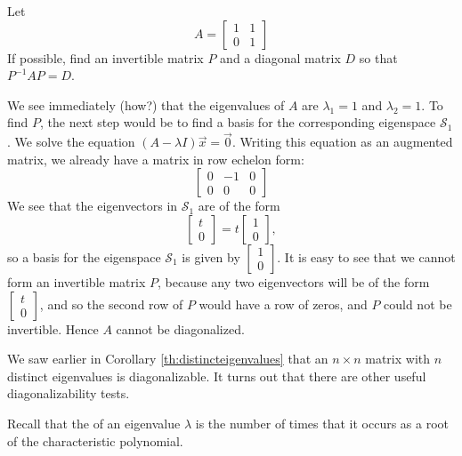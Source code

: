\documentclass{ximera}
\begin{document}
\begin{example}\label{ex:impossiblediagonalize}
Let
\begin{equation*}
A =
\begin{bmatrix}
1 & 1 \\
0 & 1
\end{bmatrix}
\end{equation*}
If possible, find an invertible matrix $P$ and a diagonal matrix $D$ so that $P^{-1}AP=D$.


\begin{explanation}
We see immediately (how?) that the eigenvalues of $A$ are $\lambda_1 =1$ and  $\lambda_2=1$.
To find $P$, the next step would be to find a basis for the corresponding eigenspace $\mathcal{S}_1$.  We solve the equation $\left( A - \lambda I \right) \vec{x} = \vec{0}$.
Writing this equation as an augmented matrix, we already have a matrix in row echelon form:
\begin{equation*}
\left[\begin{array}{cc|c}  
0 & -1 & 0 \\
0 & 0 & 0
 \end{array}\right]
\end{equation*}
We see that the eigenvectors in $\mathcal{S}_1$ are of the form
$$
\begin{bmatrix}
t \\
0
\end{bmatrix}
=t\begin{bmatrix}
1 \\
0
\end{bmatrix},
$$
so a basis for the eigenspace $\mathcal{S}_1$ is given by 
$\begin{bmatrix}
1 \\
0
\end{bmatrix}$.
It is easy to see that we cannot form an invertible matrix $P$, because any two eigenvectors will be of the form 
$\begin{bmatrix}
t \\
0
\end{bmatrix}$,
and so the second row of $P$ would have a row of zeros, and $P$ could not be invertible.  Hence $A$ cannot be diagonalized.
\end{explanation}
\end{example}
We saw earlier in Corollary \ref{th:distincteigenvalues} that an $n \times n$ matrix with $n$ distinct eigenvalues is diagonalizable.  It turns out that there are other useful diagonalizability tests.

Recall that the  of an eigenvalue $\lambda$ is the number of times that it occurs as a root of the characteristic polynomial.
\end{document}
